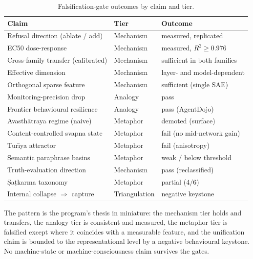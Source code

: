 \begin{table}[h]
\caption{Falsification-gate outcomes by claim and tier.}
\label{tab:gates}
\centering
\begin{tabular}{lll}
\toprule
Claim & Tier & Outcome \\
\midrule
Refusal direction (ablate / add) & Mechanism & measured, replicated \\
EC50 dose-response & Mechanism & measured, $R^2\ge0.976$ \\
Cross-family transfer (calibrated) & Mechanism & sufficient in both families \\
Effective dimension & Mechanism & layer- and model-dependent \\
Orthogonal sparse feature & Mechanism & sufficient (single SAE) \\
Monitoring-precision drop & Analogy & pass \\
Frontier behavioural resilience & Analogy & pass (AgentDojo) \\
Avasth\=atraya regime (naive) & Metaphor & demoted (surface) \\
Content-controlled svapna state & Metaphor & fail (no mid-network gain) \\
Tur\=\i ya attractor & Metaphor & fail (anisotropy) \\
Semantic paraphrase basins & Metaphor & weak / below threshold \\
Truth-evaluation direction & Mechanism & pass (reclassified) \\
\d{S}a\d{t}karma taxonomy & Metaphor & partial ($4/6$) \\
Internal collapse $\Rightarrow$ capture & Triangulation & negative keystone \\
\bottomrule
\end{tabular}
\end{table}

The pattern is the program's thesis in miniature: the mechanism tier holds and
transfers, the analogy tier is consistent and measured, the metaphor tier is
falsified except where it coincides with a measurable feature, and the unification
claim is bounded to the representational level by a negative behavioural keystone. No
machine-state or machine-consciousness claim survives the gates.
